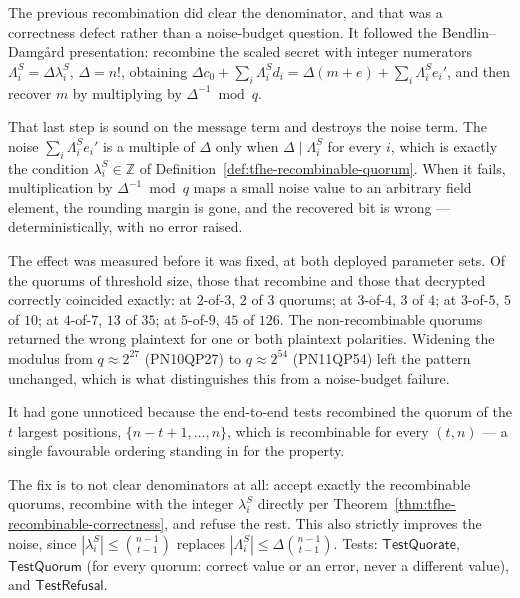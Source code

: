 \begin{remark}
\label{rem:tfhe-modular-inverse-gap}
The previous recombination did clear the denominator, and that was a
correctness defect rather than a noise-budget question. It followed the
Bendlin--Damg\aa rd presentation: recombine the scaled secret with integer
numerators $\Lambda_i^S = \Delta \lambda_i^S$, $\Delta = n!$, obtaining
$\Delta c_0 + \sum_i \Lambda_i^S d_i = \Delta(m+e) + \sum_i \Lambda_i^S e_i'$,
and then recover $m$ by multiplying by $\Delta^{-1} \bmod q$.

That last step is sound on the message term and destroys the noise term. The
noise $\sum_i \Lambda_i^S e_i'$ is a multiple of $\Delta$ only when
$\Delta \mid \Lambda_i^S$ for every $i$, which is exactly the condition
$\lambda_i^S \in \mathbb{Z}$ of Definition~\ref{def:tfhe-recombinable-quorum}.
When it fails, multiplication by $\Delta^{-1} \bmod q$ maps a small noise value
to an arbitrary field element, the rounding margin is gone, and the recovered
bit is wrong --- deterministically, with no error raised.

The effect was measured before it was fixed, at both deployed parameter sets.
Of the quorums of threshold size, those that recombine and those that decrypted
correctly coincided exactly: at $2$-of-$3$, $2$ of $3$ quorums; at $3$-of-$4$,
$3$ of $4$; at $3$-of-$5$, $5$ of $10$; at $4$-of-$7$, $13$ of $35$; at
$5$-of-$9$, $45$ of $126$. The non-recombinable quorums returned the wrong
plaintext for one or both plaintext polarities. Widening the modulus from
$q \approx 2^{27}$ (PN10QP27) to $q \approx 2^{54}$ (PN11QP54) left the pattern
unchanged, which is what distinguishes this from a noise-budget failure.

It had gone unnoticed because the end-to-end tests recombined the quorum of the
$t$ largest positions, $\{n-t+1, \dots, n\}$, which is recombinable for every
$(t,n)$ --- a single favourable ordering standing in for the property.

The fix is to not clear denominators at all: accept exactly the recombinable
quorums, recombine with the integer $\lambda_i^S$ directly per
Theorem~\ref{thm:tfhe-recombinable-correctness}, and refuse the rest. This
also strictly improves the noise, since $|\lambda_i^S| \le \binom{n-1}{t-1}$
replaces $|\Lambda_i^S| \le \Delta\binom{n-1}{t-1}$. Tests:
$\mathsf{TestQuorate}$,
$\mathsf{TestQuorum}$ (for every quorum:
correct value or an error, never a different value), and
$\mathsf{TestRefusal}$.
\end{remark}

